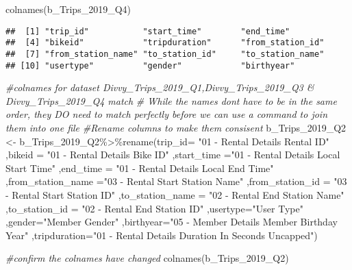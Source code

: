 \documentclass[
]{article}
\newenvironment{Shaded}{\begin{snugshade}}{\end{snugshade}}
\newcommand{\AttributeTok}[1]{\textcolor[rgb]{0.77,0.63,0.00}{#1}}
\newcommand{\CommentTok}[1]{\textcolor[rgb]{0.56,0.35,0.01}{\textit{#1}}}
\newcommand{\FunctionTok}[1]{\textcolor[rgb]{0.00,0.00,0.00}{#1}}
\newcommand{\NormalTok}[1]{#1}
\newcommand{\OtherTok}[1]{\textcolor[rgb]{0.56,0.35,0.01}{#1}}
\newcommand{\SpecialCharTok}[1]{\textcolor[rgb]{0.00,0.00,0.00}{#1}}
\newcommand{\StringTok}[1]{\textcolor[rgb]{0.31,0.60,0.02}{#1}}
\begin{document}
\begin{Shaded}
\begin{Highlighting}[]
\FunctionTok{colnames}\NormalTok{(b\_Trips\_2019\_Q4)}
\end{Highlighting}
\end{Shaded}

\begin{verbatim}
##  [1] "trip_id"           "start_time"        "end_time"         
##  [4] "bikeid"            "tripduration"      "from_station_id"  
##  [7] "from_station_name" "to_station_id"     "to_station_name"  
## [10] "usertype"          "gender"            "birthyear"
\end{verbatim}

\begin{Shaded}
\begin{Highlighting}[]
\CommentTok{\#colnames for dataset Divvy\_Trips\_2019\_Q1,Divvy\_Trips\_2019\_Q3 \& Divvy\_Trips\_2019\_Q4 match}
\CommentTok{\# While the names don\textquotesingle{}t have to be in the same order, they DO need to match perfectly before we can use a command to join them into one file}
\CommentTok{\#Rename columns  to make them consisent}
\NormalTok{b\_Trips\_2019\_Q2 }\OtherTok{\textless{}{-}}\NormalTok{ b\_Trips\_2019\_Q2}\SpecialCharTok{\%\textgreater{}\%}\FunctionTok{rename}\NormalTok{(}\AttributeTok{trip\_id=} \StringTok{"01 {-} Rental Details Rental ID"}
\NormalTok{         ,}\AttributeTok{bikeid =} \StringTok{"01 {-} Rental Details Bike ID"}
\NormalTok{         ,}\AttributeTok{start\_time =}\StringTok{"01 {-} Rental Details Local Start Time"} 
\NormalTok{         ,}\AttributeTok{end\_time =} \StringTok{"01 {-} Rental Details Local End Time"}
\NormalTok{         ,}\AttributeTok{from\_station\_name =}\StringTok{"03 {-} Rental Start Station Name"}
\NormalTok{         ,}\AttributeTok{from\_station\_id =} \StringTok{"03 {-} Rental Start Station ID"}
\NormalTok{         ,}\AttributeTok{to\_station\_name =} \StringTok{"02 {-} Rental End Station Name"}
\NormalTok{         ,}\AttributeTok{to\_station\_id =} \StringTok{"02 {-} Rental End Station ID"}
\NormalTok{         ,}\AttributeTok{usertype=}\StringTok{"User Type"}
\NormalTok{         ,}\AttributeTok{gender=}\StringTok{"Member Gender"}
\NormalTok{         ,}\AttributeTok{birthyear=}\StringTok{"05 {-} Member Details Member Birthday Year"}
\NormalTok{         ,}\AttributeTok{tripduration=}\StringTok{"01 {-} Rental Details Duration In Seconds Uncapped"}\NormalTok{)}

\CommentTok{\#confirm the colnames have changed}
\FunctionTok{colnames}\NormalTok{(b\_Trips\_2019\_Q2)}
\end{Highlighting}
\end{Shaded}
\end{document}
